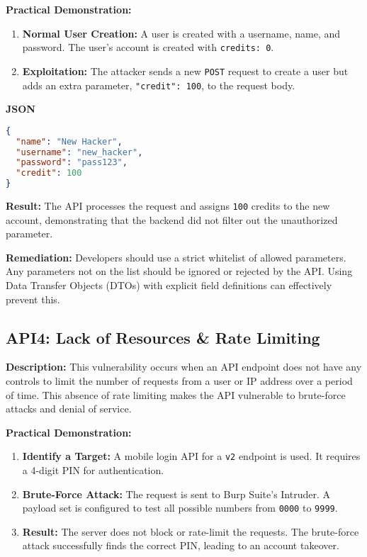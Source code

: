 \documentclass[12pt]{article}
\begin{document}
\textbf{Practical Demonstration:}
\begin{enumerate}
  \item \textbf{Normal User Creation:} A user is created with a username, name, and password. The
  user's account is created with \texttt{credits: 0}.
  \item \textbf{Exploitation:} The attacker sends a new \texttt{POST} request to create a user but adds an extra
  parameter, \texttt{"credit": 100}, to the request body.
\end{enumerate}

\textbf{JSON}
\begin{lstlisting}[language=json]
{
  "name": "New Hacker",
  "username": "new_hacker",
  "password": "pass123",
  "credit": 100
}
\end{lstlisting}

\textbf{Result:} The API processes the request and assigns \texttt{100} credits to the new account,
demonstrating that the backend did not filter out the unauthorized parameter.

\textbf{Remediation:} Developers should use a strict whitelist of allowed parameters. Any parameters
not on the list should be ignored or rejected by the API. Using Data Transfer Objects (DTOs)
with explicit field definitions can effectively prevent this.

\subsection*{API4: Lack of Resources \& Rate Limiting}
\textbf{Description:} This vulnerability occurs when an API endpoint does not have any controls to
limit the number of requests from a user or IP address over a period of time. This absence of
rate limiting makes the API vulnerable to brute-force attacks and denial of service.

\textbf{Practical Demonstration:}
\begin{enumerate}
  \item \textbf{Identify a Target:} A mobile login API for a \texttt{v2} endpoint is used. It requires a 4-digit
  PIN for authentication.
  \item \textbf{Brute-Force Attack:} The request is sent to Burp Suite's Intruder. A payload set is
  configured to test all possible numbers from \texttt{0000} to \texttt{9999}.
  \item \textbf{Result:} The server does not block or rate-limit the requests. The brute-force attack
  successfully finds the correct PIN, leading to an account takeover.
\end{enumerate}
\end{document}
